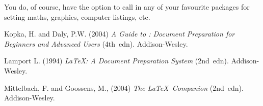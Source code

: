 \documentclass[11pt,a4paper]{article}
\begin{document}
You do, of course, have the option to call in any of your
favourite packages for setting maths, graphics, computer listings,
etc.

\begin{thebibliography}{9}

Kopka, H. and Daly, P.W.  (2004) \textit{A Guide to \LaTeXe:
Document Preparation for Beginners and Advanced Users} (4th~edn).
Addison-Wesley.

Lamport L. (1994) \textit{\LaTeX: A Document Preparation System}
(2nd~edn). Addison-Wesley.

Mittelbach, F. and Goossens, M., (2004) \textit{The \LaTeX\
Companion} (2nd~edn). Addison-Wesley.

\end{thebibliography}
\end{document}
